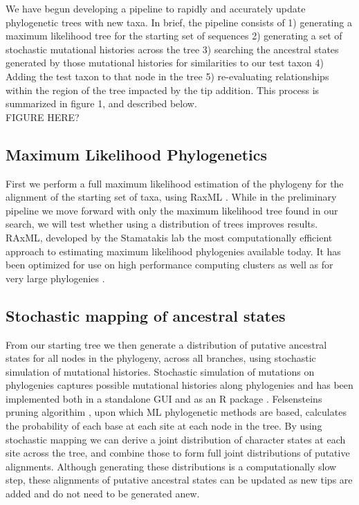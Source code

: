 \documentclass[10pt]{article}
\begin{document}
We have begun developing a pipeline to rapidly and accurately update phylogenetic trees with new taxa. In brief, the pipeline consists of 1) generating a maximum likelihood tree for the starting set of sequences 2) generating a set of stochastic mutational histories across the tree 3) searching the ancestral states generated by those mutational histories for similarities to our test taxon 4) Adding the test taxon to that node in the tree 5) re-evaluating relationships within the region of the tree impacted by the tip addition. This process is summarized in figure 1, and described below.
\\     FIGURE HERE?

\subsection*{Maximum Likelihood Phylogenetics}
First we perform a full maximum likelihood estimation of the phylogeny for the alignment of the starting set of taxa, using RaxML \cite{stamatakis_RAxML-VI-HPC:_2006}. While in the preliminary pipeline we move forward with only the maximum likelihood tree found in our search, we will test whether using a distribution of trees improves results. RAxML, developed by the Stamatakis lab the most computationally efficient approach to estimating maximum likelihood phylogenies available today. It has been optimized for use on high performance computing clusters \cite{stamatakis_RAxML-VI-HPC:_2006} as well as for very large phylogenies \cite{stamatakis_RAxML-Light:_2012}.

\subsection*{Stochastic mapping of ancestral states}
From our starting tree we then generate a distribution of putative ancestral states for all nodes in the phylogeny, across all branches, using stochastic simulation of mutational histories. Stochastic simulation of mutations on phylogenies captures possible mutational histories along phylogenies \cite{nielsen_mapping_2002}\cite{huelsenbeck_stochastic_2003} and has been implemented both in a standalone GUI \cite{bollback_simmap:_2006} and as an R package \cite{revell_phytools:_2012}. Felsensteins pruning algorithim \cite{felsenstein_evolutionary_1981}, upon which ML phylogenetic methods are based, calculates the probability of each base at each site at each node in the tree. By using stochastic mapping we can derive a joint distribution of character states at each site across the tree, and combine those to form full joint distributions of putative alignments. Although generating these distributions is a computationally slow step, these alignments of putative ancestral states can be updated as new tips are added and do not need to be generated anew. 
\end{document}
